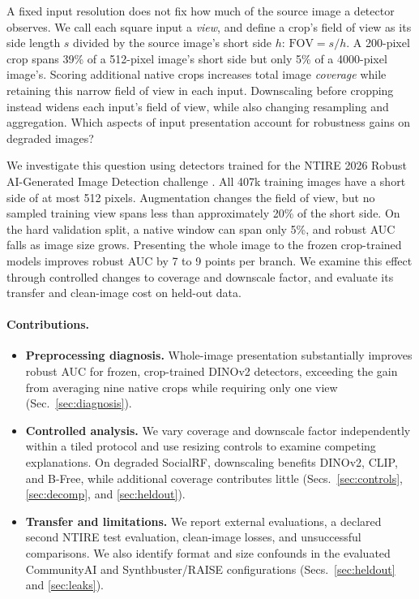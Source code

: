 \documentclass[letterpaper]{article} %
\newcommand{\fov}{\mathrm{FOV}}
\begin{document}
A fixed input resolution does not fix how much of the source image a
detector observes. We call each square input a \emph{view}, and define a
crop's field of view as its side length $s$ divided by the source image's
short side $h$: $\fov = s/h$. A 200-pixel crop spans 39\% of a 512-pixel
image's short side but only 5\% of a 4000-pixel image's. Scoring additional
native crops increases total image \emph{coverage} while retaining this
narrow field of view in each input. Downscaling before cropping instead
widens each input's field of view, while also changing resampling and
aggregation. Which aspects of input presentation account for robustness
gains on degraded images?

We investigate this question using detectors trained for the NTIRE 2026
Robust AI-Generated Image Detection challenge \cite{gushchin2026ntire}.
All 407k training images have a short side of at most 512 pixels.
Augmentation changes the field of view, but no sampled training view spans
less than approximately 20\% of the short side. On the hard validation
split, a native window can span only 5\%, and robust AUC falls as image
size grows. Presenting the whole image to the frozen crop-trained models
improves robust AUC by 7 to 9 points per branch. We examine this effect
through controlled changes to coverage and downscale factor, and evaluate
its transfer and clean-image cost on held-out data.

\paragraph{Contributions.}
\begin{itemize}
\item \textbf{Preprocessing diagnosis.} Whole-image presentation substantially
  improves robust AUC for frozen, crop-trained DINOv2 detectors, exceeding
  the gain from averaging nine native crops while requiring only one view
  (Sec.~\ref{sec:diagnosis}).
\item \textbf{Controlled analysis.} We vary coverage and downscale factor
  independently within a tiled protocol and use resizing controls to
  examine competing explanations. On degraded SocialRF, downscaling
  benefits DINOv2, CLIP, and B-Free, while additional coverage contributes
  little (Secs.~\ref{sec:controls}, \ref{sec:decomp}, and \ref{sec:heldout}).
\item \textbf{Transfer and limitations.} We report external evaluations, a
  declared second NTIRE test evaluation, clean-image losses, and
  unsuccessful comparisons. We also identify format and size confounds in
  the evaluated CommunityAI and Synthbuster/RAISE configurations
  (Secs.~\ref{sec:heldout} and \ref{sec:leaks}).
\end{itemize}
\end{document}
